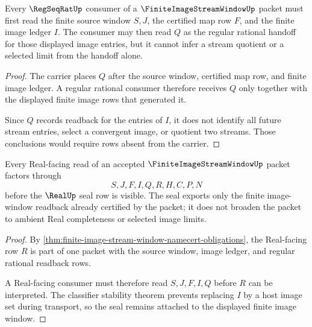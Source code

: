 \begin{theorem}
\label{thm:finite-image-stream-window-regseqrat-handoff}
Every $\RegSeqRatUp$ consumer of a $\FiniteImageStreamWindowUp$ packet must first read the finite source window $S,J$, the certified map row $F$, and the finite image ledger $I$. The consumer may then read $Q$ as the regular rational handoff for those displayed image entries, but it cannot infer a stream quotient or a selected limit from the handoff alone.
\end{theorem}
\begin{proof}
The carrier places $Q$ after the source window, certified map row, and finite image ledger. A regular rational consumer therefore receives $Q$ only together with the displayed finite image rows that generated it.

Since $Q$ records readback for the entries of $I$, it does not identify all future stream entries, select a convergent image, or quotient two streams. Those conclusions would require rows absent from the carrier.
\end{proof}

\begin{theorem}
\label{thm:finite-image-stream-window-real-seal-nonescape}
Every Real-facing read of an accepted $\FiniteImageStreamWindowUp$ packet factors through
$$
S,J,F,I,Q,R,H,C,P,N
$$
before the $\RealUp$ seal row is visible. The seal exports only the finite image-window readback already certified by the packet; it does not broaden the packet to ambient Real completeness or selected image limits.
\end{theorem}
\begin{proof}
By \autoref{thm:finite-image-stream-window-namecert-obligations}, the Real-facing row $R$ is part of one packet with the source window, image ledger, and regular rational readback rows.

A Real-facing consumer must therefore read $S,J,F,I,Q$ before $R$ can be interpreted. The classifier stability theorem prevents replacing $I$ by a host image set during transport, so the seal remains attached to the displayed finite image window.
\end{proof}


